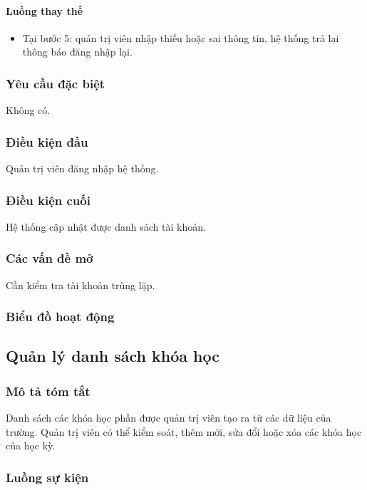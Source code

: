 \documentclass[./../main_file.tex]{subfiles}
\begin{document}
\paragraph{Luồng thay thế}
\begin{itemize}
	\item Tại bước 5: quản trị viên nhập thiếu hoặc sai thông tin, hệ thống trả lại thông báo đăng nhập lại.
\end{itemize}
\subsubsection{Yêu cầu đặc biệt}
Không có.
\subsubsection{Điều kiện đầu}
Quản trị viên đăng nhập hệ thống.

\subsubsection{Điều kiện cuối}
Hệ thống cập nhật được danh sách tài khoản.

\subsubsection{Các vấn đề mở}
Cần kiểm tra tài khoản trùng lặp.

\subsubsection{Biểu đồ hoạt động}

\subsection{Quản lý danh sách khóa học}
\subsubsection{Mô tả tóm tắt}
Danh sách các khóa học phần được quản trị viên tạo ra từ các dữ liệu của trường. Quản trị viên có thể kiểm soát, thêm mới, sửa đổi hoặc xóa các khóa học của học kỳ.

\subsubsection{Luồng sự kiện}
\end{document}
